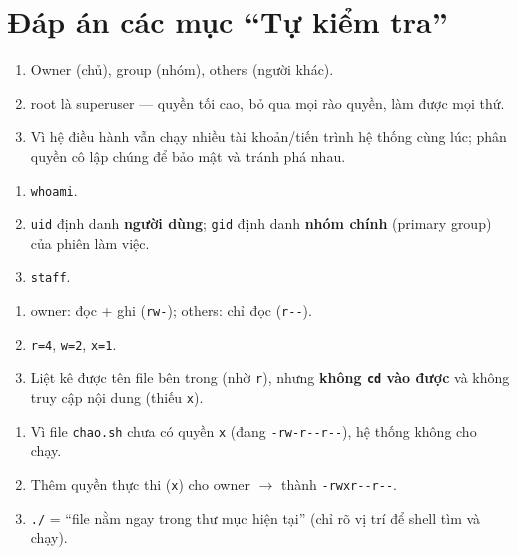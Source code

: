\documentclass[12pt,a4paper]{article}
\newcommand{\cmd}[1]{\texttt{#1}}
\begin{document}
\section*{Đáp án các mục ``Tự kiểm tra''}

\begin{checkbox}[Đáp án 5.1]
\begin{enumerate}
\item Owner (chủ), group (nhóm), others (người khác).
\item root là superuser --- quyền tối cao, bỏ qua mọi rào quyền, làm được mọi thứ.
\item Vì hệ điều hành vẫn chạy nhiều tài khoản/tiến trình hệ thống cùng lúc; phân
  quyền cô lập chúng để bảo mật và tránh phá nhau.
\end{enumerate}
\end{checkbox}

\begin{checkbox}[Đáp án 5.2]
\begin{enumerate}
\item \cmd{whoami}.
\item \cmd{uid} định danh \textbf{người dùng}; \cmd{gid} định danh \textbf{nhóm
  chính} (primary group) của phiên làm việc.
\item \cmd{staff}.
\end{enumerate}
\end{checkbox}

\begin{checkbox}[Đáp án 5.3]
\begin{enumerate}
\item owner: đọc + ghi (\cmd{rw-}); others: chỉ đọc (\cmd{r-{}-}).
\item \cmd{r=4}, \cmd{w=2}, \cmd{x=1}.
\item Liệt kê được tên file bên trong (nhờ \cmd{r}), nhưng \textbf{không \cmd{cd}
  vào được} và không truy cập nội dung (thiếu \cmd{x}).
\end{enumerate}
\end{checkbox}

\begin{checkbox}[Đáp án 5.4]
\begin{enumerate}
\item Vì file \cmd{chao.sh} chưa có quyền \cmd{x} (đang \cmd{-rw-r-{}-r-{}-}), hệ
  thống không cho chạy.
\item Thêm quyền thực thi (\cmd{x}) cho owner $\rightarrow$ thành \cmd{-rwxr-{}-r-{}-}.
\item \cmd{./} = ``file nằm ngay trong thư mục hiện tại'' (chỉ rõ vị trí để shell
  tìm và chạy).
\end{enumerate}
\end{checkbox}
\end{document}
